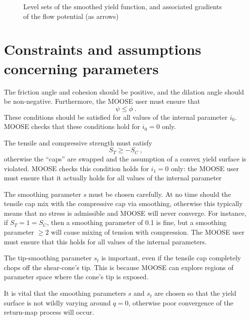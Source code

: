 \documentclass[]{scrreprt}
\begin{document}
\begin{figure}[htb]
\begin{center}
\caption{Level sets of the smoothed yield function, and associated
  gradients of the flow potential (as arrows)}
\label{smoothed_entire.fig}
\end{center}
\end{figure}





\chapter{Constraints and assumptions concerning parameters}
\label{assumptions.sec}

The friction angle and cohesion should be positive, and the dilation
angle should be non-negative.  Furthermore, the MOOSE user must ensure that
\begin{equation}
\psi \leq \phi \ .
\end{equation}
These conditions should be satisfied for all values of the internal
parameter $i_{0}$.  MOOSE checks that these conditions hold for
$i_{0}=0$ only.

The tensile and compressive strength must satisfy
\begin{equation}
S_{T} \geq -S_{C} \ ,
\end{equation}
otherwise the ``caps'' are swapped and the assumption of a convex
yield surface is violated.  MOOSE checks this condition holds for
$i_{1}=0$ only: the MOOSE user must ensure that it actually holds for
all values of the internal parameter

The smoothing parameter $s$ must be chosen carefully.  At no time should
the tensile cap mix with the compressive cap via smoothing, otherwise
this typically means that no stress is admissible and MOOSE will never
converge.  For instance, if $S_{T}=1=S_{C}$, then a smoothing
parameter of 0.1 is fine, but a smoothing parameter $\geq 2$ will
cause mixing of tension with compression.  The MOOSE user must ensure
that this holds for all values of the internal parameters.

The tip-smoothing parameter $s_{t}$ is important, even if the tensile cap
completely chops off the shear-cone's tip.  This is because MOOSE can
explore regions of parameter space where the cone's tip is exposed.

It is vital that the smoothing parameters $s$ and $s_{t}$ are chosen so
that the yield surface is not wildly varying around $q=0$, otherwise
poor convergence of the return-map process will occur.
\end{document}

